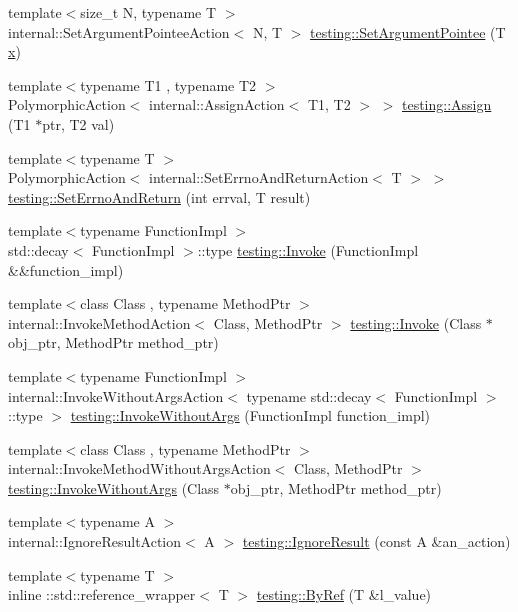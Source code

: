 \begin{DoxyCompactItemize}
\item 
{\footnotesize template$<$size\+\_\+t N, typename T $>$ }\\internal\+::\+Set\+Argument\+Pointee\+Action$<$ N, T $>$ \mbox{\hyperlink{namespacetesting_a470bcfec000440453700ee7a4e301874}{testing\+::\+Set\+Argument\+Pointee}} (T \mbox{\hyperlink{_obj__test_2lib_2googletest-master_2googlemock_2test_2gmock-matchers__test_8cc_a6150e0515f7202e2fb518f7206ed97dc}{x}})
\item 
{\footnotesize template$<$typename T1 , typename T2 $>$ }\\Polymorphic\+Action$<$ internal\+::\+Assign\+Action$<$ T1, T2 $>$ $>$ \mbox{\hyperlink{namespacetesting_a630f14770743960d9d1b7c71cfd9034c}{testing\+::\+Assign}} (T1 $\ast$ptr, T2 val)
\item 
{\footnotesize template$<$typename T $>$ }\\Polymorphic\+Action$<$ internal\+::\+Set\+Errno\+And\+Return\+Action$<$ T $>$ $>$ \mbox{\hyperlink{namespacetesting_a6f466024040fa05349773514ce1c6647}{testing\+::\+Set\+Errno\+And\+Return}} (int errval, T result)
\item 
{\footnotesize template$<$typename Function\+Impl $>$ }\\std\+::decay$<$ Function\+Impl $>$\+::type \mbox{\hyperlink{namespacetesting_af5cacf4475557b5a3e37af3836564235}{testing\+::\+Invoke}} (Function\+Impl \&\&function\+\_\+impl)
\item 
{\footnotesize template$<$class Class , typename Method\+Ptr $>$ }\\internal\+::\+Invoke\+Method\+Action$<$ Class, Method\+Ptr $>$ \mbox{\hyperlink{namespacetesting_af6a7c9befa6ff00198434995586151c3}{testing\+::\+Invoke}} (Class $\ast$obj\+\_\+ptr, Method\+Ptr method\+\_\+ptr)
\item 
{\footnotesize template$<$typename Function\+Impl $>$ }\\internal\+::\+Invoke\+Without\+Args\+Action$<$ typename std\+::decay$<$ Function\+Impl $>$\+::type $>$ \mbox{\hyperlink{namespacetesting_aabc08d610483908c8346f2e3318ad449}{testing\+::\+Invoke\+Without\+Args}} (Function\+Impl function\+\_\+impl)
\item 
{\footnotesize template$<$class Class , typename Method\+Ptr $>$ }\\internal\+::\+Invoke\+Method\+Without\+Args\+Action$<$ Class, Method\+Ptr $>$ \mbox{\hyperlink{namespacetesting_ab2961856113ff9af02fdf12c71b8a5f5}{testing\+::\+Invoke\+Without\+Args}} (Class $\ast$obj\+\_\+ptr, Method\+Ptr method\+\_\+ptr)
\item 
{\footnotesize template$<$typename A $>$ }\\internal\+::\+Ignore\+Result\+Action$<$ A $>$ \mbox{\hyperlink{namespacetesting_a257c9395b54e9267a0348a6310128889}{testing\+::\+Ignore\+Result}} (const A \&an\+\_\+action)
\item 
{\footnotesize template$<$typename T $>$ }\\inline \+::std\+::reference\+\_\+wrapper$<$ T $>$ \mbox{\hyperlink{namespacetesting_a1f94a81e042d7c40c8359c1471fbb61e}{testing\+::\+By\+Ref}} (T \&l\+\_\+value)
\end{DoxyCompactItemize}


